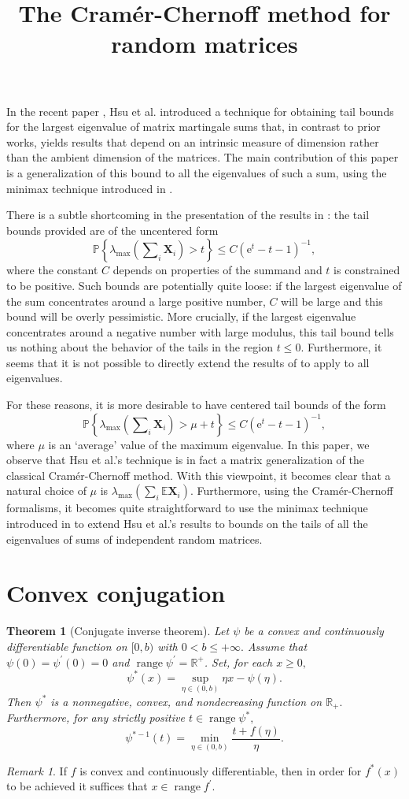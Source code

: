\documentclass[reqno]{amsart}
\newcommand{\mat}[1]{\ensuremath{\bm{#1}}} %
\newcommand{\e}{\ensuremath{\mathrm{e}}}
\newcommand{\E}{\ensuremath{\mathbb{E}}}
\newcommand{\Prob}[1]{\ensuremath{\mathbb{P}\left\{#1\right\}}}
\newcommand{\R}{\ensuremath{\mathbb{R}}}
\DeclareMathOperator{\range}{range}
\newcommand{\lambdamax}[1]{\ensuremath{\lambda_{\mathrm{max}}\left(#1\right)}}
\newtheorem{thm}{Theorem}
\theoremstyle{remark}
\newtheorem{remark}{Remark}
\begin{document}
\title{The Cram\'er-Chernoff method for random matrices}

In the recent paper \cite{dimensionfree}, Hsu et al. introduced a technique for obtaining tail bounds for the largest eigenvalue of matrix martingale sums that, in contrast to prior works, yields results that depend on an intrinsic measure of dimension rather than the ambient dimension of the matrices. The main contribution of this paper is a generalization of this bound to all the eigenvalues of such a sum, using the minimax technique introduced in \cite{minimaxlaplace}. 

There is a subtle shortcoming in the presentation of the results in \cite{dimensionfree}: the tail bounds provided are of the uncentered form
\[
\Prob{\lambdamax{\sum\nolimits_i \mat{X}_i} > t} \leq C (\e^t - t - 1)^{-1}, 
\]
where the constant $C$ depends on properties of the summand and $t$ is constrained to be positive. Such bounds are potentially quite loose: if the largest eigenvalue of the sum concentrates around a large positive number, $C$ will be large and this bound will be overly pessimistic. More crucially, if the largest eigenvalue concentrates around a negative number with large modulus, this tail bound tells us nothing about the behavior of the tails in the region ${t \leq 0}.$ Furthermore, it seems that it is not possible to directly extend the results of \cite{dimensionfree} to apply to all eigenvalues. 

For these reasons, it is more desirable to have centered tail bounds of the form
\[
\Prob{\lambdamax{\sum\nolimits_i \mat{X}_i} > \mu + t} \leq C (\e^t - t - 1)^{-1}, 
\]
where $\mu$ is an `average' value of the maximum eigenvalue. In this paper, we observe that Hsu et al.'s technique is in fact a matrix generalization of the classical Cram\'er-Chernoff method. With this viewpoint, it becomes clear that a natural choice of $\mu$ is $\lambdamax{\sum_i \E \mat{X}_i}.$ Furthermore, using the Cram\'er-Chernoff formalisms, it becomes quite straightforward to use the minimax technique introduced in \cite{minimaxlaplace} to extend Hsu et al.'s results to bounds on the tails of all the eigenvalues of sums of independent random matrices.

\section*{Convex conjugation}

\begin{thm}[Conjugate inverse theorem]
Let $\psi$ be a convex and continuously differentiable function on $[0,b)$ with $0 < b \leq +\infty.$ Assume that $\psi(0) = \psi^\prime(0) = 0$ and $\range{\psi^\prime} = \R^+$. Set, for each $x \geq 0,$
\[
\psi^*(x) = \sup_{\eta \in (0,b)} \eta x - \psi(\eta).
\]
Then $\psi^*$ is a nonnegative, convex, and nondecreasing function on $\R_+.$ Furthermore, for any strictly positive $t \in \range{\psi^*},$
\[
\psi^{*-1}(t) = \min_{\eta \in (0,b)} \frac{t + f(\eta)}{\eta}.
\]
\end{thm}
\begin{remark}
If $f$ is convex and continuously differentiable, then in order for $f^*(x)$ to be achieved it suffices that $x \in \range{f^\prime}.$
\end{remark}
\end{document}
